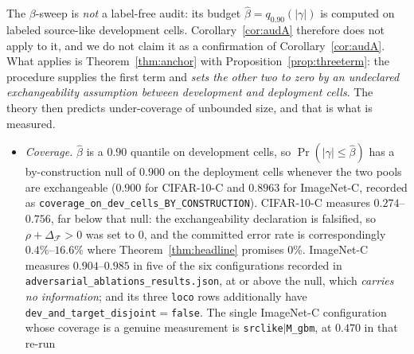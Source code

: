%

\begin{remark}\label{rem:empirical}
The $\beta$-sweep is \emph{not} a label-free audit: its budget
$\widehat\beta=q_{0.90}(|\gamma|)$ is computed on labeled source-like development cells.
Corollary~\ref{cor:audA} therefore does not apply to it, and we do not claim it as a confirmation of
Corollary~\ref{cor:audA}. What applies is Theorem~\ref{thm:anchor} with
Proposition~\ref{prop:threeterm}: the procedure supplies the first term and \emph{sets the other two
to zero by an undeclared exchangeability assumption between development and deployment cells}. The
theory then predicts under-coverage of unbounded size, and that is what is measured.
\begin{itemize}
\item \emph{Coverage.} $\widehat\beta$ is a $0.90$ quantile on development cells, so
$\Pr(|\gamma|\le\widehat\beta)$ has a by-construction null of $0.900$ on the deployment cells
whenever the two pools are exchangeable ($0.900$ for CIFAR-10-C and $0.8963$ for ImageNet-C,
recorded as \texttt{coverage\_on\_dev\_cells\_BY\_CONSTRUCTION}). CIFAR-10-C measures
$0.274$--$0.756$, far below that null: the exchangeability declaration is falsified, so
$\rho+\Delta_{\mathcal F}>0$ was set to $0$, and the committed error rate is correspondingly
$0.4\%$--$16.6\%$ where Theorem~\ref{thm:headline} promises $0\%$. ImageNet-C measures
$0.904$--$0.985$ in five of the six configurations recorded in
\texttt{adversarial\_ablations\_results.json}, at or above the null, which \emph{carries no
information}; and its three \texttt{loco} rows additionally have
\texttt{dev\_and\_target\_disjoint}$=$\texttt{false}. The single ImageNet-C configuration whose
coverage is a genuine measurement is \texttt{srclike}$|$\texttt{M\_gbm}, at $0.470$ in that re-run

\end{itemize}
\end{remark}
